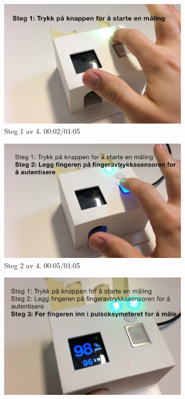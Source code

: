 \begin{figure}
\begin{subfigure}{.5\textwidth}
  \includegraphics[width=1.0\linewidth]{fig/prototype/steg1}
  \caption{Steg 1 av 4. 00:02/01:05}
  \label{fig:steg1}
\end{subfigure}%
\begin{subfigure}{.5\textwidth}
  \includegraphics[width=1.0\linewidth]{fig/prototype/steg2}
  \caption{Steg 2 av 4. 00:05/01:05}
  \label{fig:steg2}
\end{subfigure}
\label{fig:test}
\begin{subfigure}{.5\textwidth}
  \includegraphics[width=1.0\linewidth]{fig/prototype/steg3}

\end{subfigure}
\end{figure}

